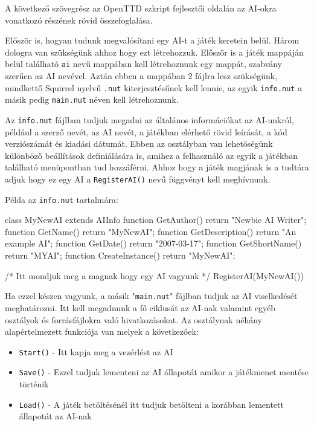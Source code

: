 
A következő szövegrész az OpenTTD szkript fejlesztői oldalán az AI-okra vonatkozó részének rövid összefoglalása\cite{noaidev}.

Először is, hogyan tudunk megvalósítani egy AI-t a játék keretein belül. Három dologra van szükségünk ahhoz hogy ezt létrehozzuk. Először is a játék mappáján belül található \texttt{ai} nevű mappában kell létrehoznunk egy mappát, szabvány szerűen az AI nevével. Aztán ebben a mappában 2 fájlra lesz szükségünk, mindkettő Squirrel nyelvű \texttt{.nut} kiterjesztésűnek kell lennie, az egyik \texttt{info.nut} a másik pedig \texttt{main.nut} néven kell létrehoznunk.

Az \texttt{info.nut} fájlban tudjuk megadni az általános információkat az AI-unkról, például a szerző nevét, az AI nevét, a játékban elérhető rövid leírását, a kód verziószámát és kiadási dátumát. Ebben az osztályban van lehetőségünk különböző beállítások definiálására is, amihez a felhasználó az egyik a játékban található menüpontban tud hozzáférni. Ahhoz hogy a játék magjának is a tudtára adjuk hogy ez egy AI a \texttt{RegisterAI()} nevű függvényt kell meghívnunk.

Példa az \texttt{info.nut} tartalmára:

\begin{cpp}
class MyNewAI extends AIInfo
{
  function GetAuthor()        { return "Newbie AI Writer"; }
  function GetName()          { return "MyNewAI"; }
  function GetDescription()   { return "An example AI"; }
  function GetDate()          { return "2007-03-17"; }
  function GetShortName()     { return "MYAI"; }
  function CreateInstance()   { return "MyNewAI"; }
}

/* Itt mondjuk meg a magnak hogy egy AI vagyunk */
RegisterAI(MyNewAI())
\end{cpp}

Ha ezzel készen vagyunk, a másik "\texttt{main.nut}" fájlban tudjuk az AI viselkedését meghatározni. Itt kell megadnunk a fő ciklusát az AI-nak valamint egyéb osztályok és forrásfájlokra való hivatkozásokat. Az osztálynak néhány alapértelmezett funkciója van melyek a következőek:

\begin{itemize}
	\item \texttt{Start()} - Itt kapja meg a vezérlést az AI
	\item \texttt{Save()} - Ezzel tudjuk lementeni az AI állapotát amikor a játékmenet mentése történik
	\item \texttt{Load()} - A játék betöltésénél itt tudjuk betölteni a korábban lementett állapotát az AI-nak
\end{itemize}

